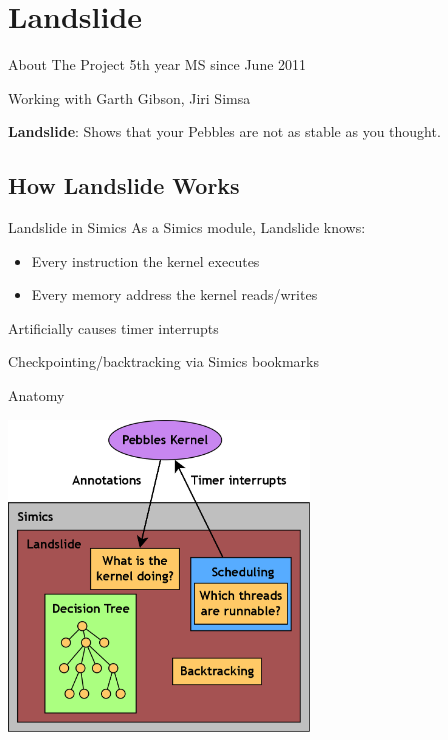 \documentclass[xcolor=dvipsnames]{beamer}
\begin{document}

\section{Landslide}


\begin{frame}{About The Project}
	5th year MS since June 2011 %

	\linegap
	Working with Garth Gibson, Jiri Simsa

	\linegap
	{\bf Landslide}: Shows that your Pebbles are not as stable as you thought.
\end{frame}


\subsection{How Landslide Works}

\begin{frame}{Landslide in Simics}
	As a Simics module, Landslide knows:
	\begin{itemize}
		\item Every instruction the kernel executes
		\item Every memory address the kernel reads/writes
	\end{itemize}
	\linegap
	Artificially causes timer interrupts

	\linegap
	Checkpointing/backtracking via Simics bookmarks
\end{frame}

\begin{frame}{Anatomy}
	\begin{center}
	\includegraphics[width=0.6\textwidth]{landslide.png}
	\end{center}
\end{frame}
\end{document}

